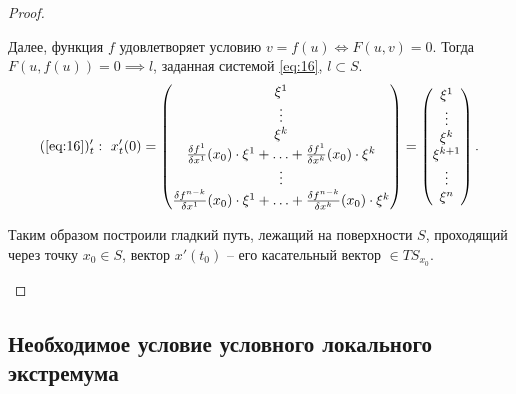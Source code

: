 \begin{proof}
\begin{enumerate}
              Далее, функция $f$ удовлетворяет условию $v = f(u) \iff F(u,v) = 0$. Тогда $F(u,f(u)) = 0\implies l$, заданная системой \ref{eq:16}, $l \subset S$.
              \[
                  (\text{\ref{eq:16}})_t': \ x_t'(0) = \left(\begin{matrix}
                          \xi^1                                                                                                  \\
                          \vdots                                                                                                 \\
                          \xi^k                                                                                                  \\
                          \frac{\delta f^1}{\delta x^1}(x_0)\cdot \xi^1 + \ldots + \frac{\delta f^1}{\delta x^k}(x_0)\cdot \xi^k \\
                          \vdots                                                                                                 \\
                          \frac{\delta f^{n-k}}{\delta x^1}(x_0)\cdot \xi^1 + \ldots + \frac{\delta f^{n-k}}{\delta x^k}(x_0)\cdot \xi^k
                      \end{matrix}\right) = \left(\begin{matrix}
                          \xi^1 \\ \vdots \\ \xi^k \\ \xi^{k+1} \\ \vdots \\ \xi^n
                      \end{matrix}\right).
              \]

              Таким образом построили гладкий путь, лежащий на поверхности $S$, проходящий через точку $x_0 \in S$, вектор $x'(t_0)$ -- его касательный вектор $\in TS_{x_0}$.
    \end{enumerate}
\end{proof}

\setcounter{subsection}{24}

\subsection{Необходимое условие условного локального экстремума}

